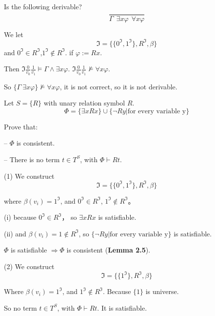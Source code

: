 \documentclass{ximera}
\begin{document}
\begin{problem} Is the following derivable?
    $$
    \frac {} {\Gamma ~~ \exists x \varphi ~~ \forall x \varphi}
    $$
    \begin{solution}
        We let 
        $$\mathfrak{I}=\{\{0^{\mathfrak{I}}, 1^{\mathfrak{I}}\}, R^{\mathfrak{I}}, \beta\}$$ 
        and $0^{\mathfrak{I}} \in R^{\mathfrak{I}}$,$1^{\mathfrak{I}} \not\in R^{\mathfrak{I}}$.
        if $\varphi := Rx$.

        Then $\mathfrak{I}\frac 0 {v_0} \frac 1 {v_1} \models \Gamma \land \exists x \varphi$.
        $\mathfrak{I}\frac 0 {v_0} \frac 1 {v_1} \not\models \forall x \varphi$.

        So $\{\Gamma ~ \exists x \varphi\} \not\models \forall x \varphi$, it is not correct, so it is not derivable.
    \end{solution}
\end{problem}

\begin{problem}
    Let $S = \{R\}$ with unary relation symbol $R$. 
    $$
        \Phi = \{\exists x Rx \} \cup \{ \neg Ry | \text{for every variable y} \}
    $$
    
    Prove that:

        – $\Phi$ is consistent.

        – There is no term $t \in T^S$, with $\Phi \vdash Rt$.
    \begin{solution}
        (1)
        We construct 
        $$\mathfrak{I} = \{ \{ 0^{\mathfrak{I}}, 1^{\mathfrak{I}} \}, R^{\mathfrak{I}}, \beta \}$$

        where $\beta(v_i)=1^{\mathfrak{I}}$, and $0^{\mathfrak{I}} \in R^{\mathfrak{I}}$, $1^{\mathfrak{I}} \not\in R^{\mathfrak{I}}$。

        (i) because $0^{\mathfrak{I}} \in R^{\mathfrak{I}}$， so $\exists x Rx$ is satisfiable.

        (ii) and $\beta(v_i)=1 \not\in R^{\mathfrak{I}}$, so $\{ \neg Ry | \text{for every variable y} \}$ is satisfiable.

        $\Phi$ is satisfiable $\Rightarrow \Phi$ is consistent (\textbf{Lemma 2.5}).

        (2)  We construct 
        $$\mathfrak{I} = \{ \{ 1^{\mathfrak{I}} \}, R^{\mathfrak{I}}, \beta \}$$

        Where $\beta(v_i)=1^{\mathfrak{I}}$, and $1^{\mathfrak{I}} \not\in R^{\mathfrak{I}}$.
        Because $\{1\}$ is universe.

        So no term $t \in T^{S}$, with $\Phi \vdash Rt$. It is satisfiable.

    \end{solution}
\end{problem}
\end{document}
